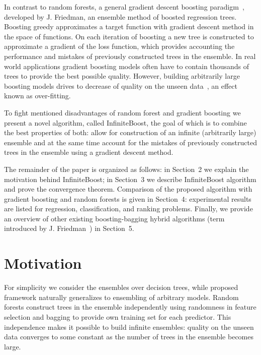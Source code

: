 In contrast to random forests, a general gradient descent boosting paradigm~\cite{key-gb,key-sgb}, developed by J. Friedman, 
an ensemble method of boosted regression trees.
Boosting greedy approximates a target function with gradient descent method in the space of functions. 
On each iteration of boosting a new tree is constructed to approximate a gradient of the loss function, %
which provides accounting the performance and mistakes of previously constructed trees in the ensemble.
In real world applications gradient boosting models often have to contain thousands of trees to provide the best possible quality.
However, building arbitrarily large boosting models drives to decrease of quality on the unseen data~\cite{key-brownboost, key-dart}, an effect known as over-fitting.

To fight mentioned disadvantages of random forest and gradient boosting we present a novel algorithm, called InfiniteBoost, the goal of which is to combine the best properties of both: allow for construction of an infinite (arbitrarily large) ensemble and at the same time account for the mistakes of previously constructed trees in the ensemble using a gradient descent method.

The remainder of the paper is organized as follows: in Section~2 we explain the motivation behind InfiniteBoost; in Section~3 we describe InfiniteBoost algorithm and prove the convergence theorem.
Comparison of the proposed algorithm with gradient boosting and random forests is given in Section~4: experimental results are listed for regression, classification, and ranking problems. 
Finally, we provide an overview of other existing boosting-bagging hybrid algorithms (term introduced by J. Friedman~\cite{key-sgb}) in Section~5.


\section{Motivation}

For simplicity we consider the ensembles over decision trees, while proposed framework naturally generalizes to ensembling of arbitrary models.
Random forests construct trees in the ensemble independently using randomness in feature selection and bagging to provide own training set for each predictor.
This independence makes it possible to build infinite ensembles: quality on the unseen data converges to some constant as the number of trees in the ensemble becomes large.

